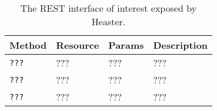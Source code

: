 \begin{table}
	\label{tbl:smart-elasticity-rest-cluster-monitor}
	\centering
	\begin{tabular}{| m{1.5cm} | m{3cm} | m{3cm} | m{6cm} | }\hline
		
		\textbf{Method} & \textbf{Resource} & \textbf{Params} & \textbf{Description} \\\hline
		
		\texttt{???}	& ???               & ???             & ??? \\\hline
		
		\texttt{???}	& ???               & ???             & ??? \\\hline
				
		\texttt{???}	& ???               & ???             & ??? \\\hline
		
	\end{tabular}
	\caption{The REST interface of interest exposed by Heaster.}
\end{table}
